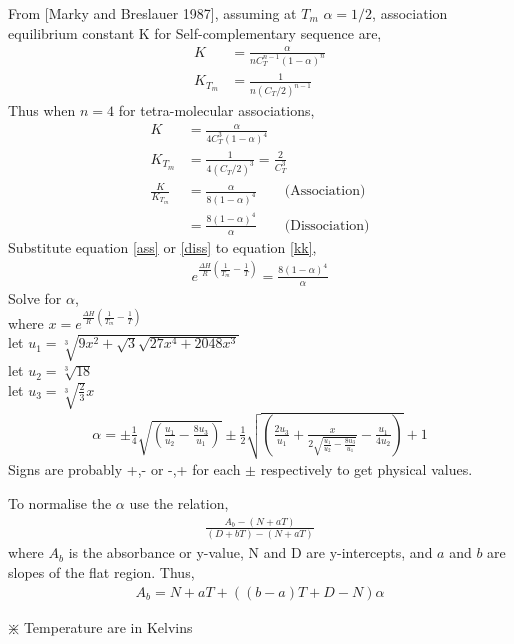 \documentclass[letterpaper, 12pt]{article}
\begin{document}
From [Marky and Breslauer 1987], assuming at $ T_m $ $\alpha = 1/2$, association equilibrium constant K for Self-complementary sequence are,
\begin{align}
	K &= \frac{\alpha}{nC_{T}^{n-1}(1-\alpha)^n}\\
	K_{T_m} &= \frac{1}{n(C_T/2)^{n-1}}
\end{align}
Thus when $ n = 4 $ for tetra-molecular associations,
\begin{align}
	K &= \frac{\alpha}{4 C_{T}^{3}(1-\alpha)^4} \label{K4}\\
	K_{T_m} &= \frac{1}{4(C_T/2)^3} = \frac{2}{C_T^3} \label{K4Tm}\\
	\frac{K}{K_{T_m}} &= \frac{\alpha}{8\left(1-\alpha\right)^4} \qquad\text{(Association)}\label{ass}\\
	& = \frac{8\left(1-\alpha\right)^4}{\alpha} \qquad\text{(Dissociation)}\label{diss}
\end{align}
Substitute equation \ref{ass} or \ref{diss} to equation \ref{kk},
\begin{align}
	e^{\frac{\Delta H}{R}\left(\frac{1}{T_m}-\frac{1}{T}\right)} = \frac{8\left(1-\alpha\right)^4}{\alpha}
\end{align}
Solve for $\alpha$,\\
where $  x = e^{\frac{\Delta H}{R}\left(\frac{1}{T_m}-\frac{1}{T}\right)}$\\
let $ u_1 = \sqrt[3]{9x^2 + \sqrt{3}\sqrt{27x^4+2048x^3}} $\\
let $ u_2 = \sqrt[3]{18} $\\
let $ u_3 = \sqrt[3]{\frac{2}{3}}x $
\begin{align}
	\alpha = \pm \frac{1}{4}\sqrt{\left(\frac{u_1}{u_2}-\frac{8u_3}{u_1}\right)}\pm \frac{1}{2}\sqrt{\left(\frac{2u_3}{u_1}+\frac{x}{2\sqrt{\frac{u_1}{u_2}-\frac{8u_3}{u_1}}}-\frac{u_1}{4u_2}\right)}+1
\end{align}
Signs are probably +,- or -,+ for each $\pm$ respectively to get physical values.

To normalise the $\alpha$ use the relation,
\begin{align}
	\frac{A_b - (N + aT)}{(D+bT)-(N+aT)}
\end{align}
where $ A_b $ is the absorbance or y-value, N and D are y-intercepts, and $ a $ and $ b $ are slopes of the flat region. Thus,
\begin{align}
	A_b = N + aT + ((b-a)T+D-N)\alpha
\end{align}

$ \divideontimes $ Temperature are in Kelvins
\end{document}
